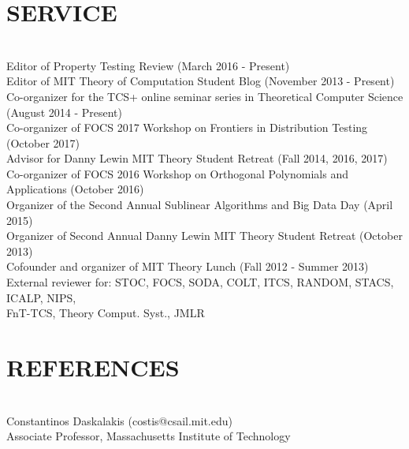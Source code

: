 \documentclass{res}
\begin{document}
\begin{resume}
\section{SERVICE}
    \vspace{-0.1in}
    \hspace{5.10in} \\
    Editor of Property Testing Review (March 2016 - Present)\\
    Editor of MIT Theory of Computation Student Blog (November 2013 - Present)\\
    Co-organizer for the TCS+ online seminar series in Theoretical Computer Science (August 2014 - Present)\\
    Co-organizer of FOCS 2017 Workshop on Frontiers in Distribution Testing (October 2017) \\
    Advisor for Danny Lewin MIT Theory Student Retreat (Fall 2014, 2016, 2017) \\
    Co-organizer of FOCS 2016 Workshop on Orthogonal Polynomials and Applications (October 2016) \\
    Organizer of the Second Annual Sublinear Algorithms and Big Data Day (April 2015) \\
    Organizer of Second Annual Danny Lewin MIT Theory Student Retreat (October 2013) \\
    Cofounder and organizer of MIT Theory Lunch (Fall 2012 - Summer 2013) \\
    External reviewer for: STOC, FOCS, SODA, COLT, ITCS, RANDOM, STACS, ICALP, NIPS, \\
    \phantom{asdf} FnT-TCS, Theory Comput. Syst., JMLR



\section{REFERENCES}
\vspace{-0.1in}
\hspace{5.10in} \\
Constantinos Daskalakis (costis@csail.mit.edu) \\
Associate Professor, Massachusetts Institute of Technology
\end{resume}
\end{document}
